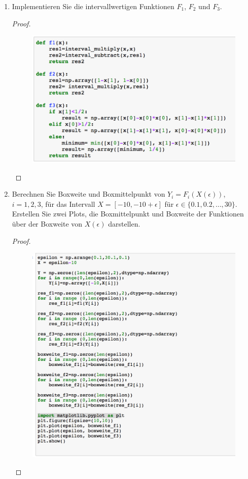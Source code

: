 \documentclass[12pt]{extreport} %
\theoremstyle{named}
\theoremstyle{nnamed}
\theoremstyle{itshape}
\theoremstyle{normal}
\begin{document}
\begin{enumerate}
\begin{proof}
\begin{itemize}
					$$ \min \left\{ \underline{x} - \underline{x}^2, x \right\}. $$
			\end{itemize}
		\end{proof}
	\item Implementieren Sie die intervallwertigen Funktionen $F_1$, $F_2$ und $F_3$.
		\begin{proof} ~\
			\begin{figure}[h!] \centering
				\includegraphics[scale=0.45]{img/su2iii-iii}
			\end{figure}
		\end{proof}   \newpage
	\item Berechnen Sie Boxweite und Boxmittelpunkt von $Y_i = F_i(X(\epsilon))$, $i = 1,2,3$, für das Intervall $X = [-10, -10 + \epsilon]$ für $\epsilon \in \{ 0.1, 0.2, \dotsc, 30\}$. Erstellen Sie zwei Plots, die Boxmittelpunkt und Boxweite der Funktionen über der Boxweite von $X(\epsilon)$ darstellen.
		\begin{proof} ~\
			\begin{figure}[h!] \centering
				\includegraphics[scale=0.45]{img/su2iii-iiii-11}

\end{figure}
\end{proof}
\end{enumerate}
\end{document}
